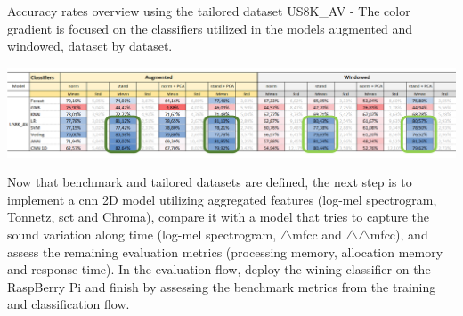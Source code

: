 \begin{table}[ht!]
    \caption[Accuracy rates overview using using the tailored dataset US8K\_AV - Models augmented x windowed (Focus on the classifiers dataset by dataset)]{Accuracy rates overview using the tailored dataset US8K\_AV - The color gradient is focused on the classifiers utilized in the models augmented and windowed, dataset by dataset.}
    \label{table:results_accuracy_overview_us8k_av_aug_wind_1}
     \raggedright
    \includegraphics[width=1\textwidth]{resources/images/060-results/Results_classification_overview_us8k_av_aug_x_ori_2.png}
\end{table}

Now that benchmark and tailored datasets are defined, the next step is to implement a \gls{cnn} 2D model utilizing aggregated features (log-mel spectrogram, Tonnetz, \gls{sct} and Chroma), compare it with a model that tries to capture the sound variation along time (log-mel spectrogram, $\triangle$\gls{mfcc} and $\triangle\triangle$\gls{mfcc}), and assess the remaining evaluation metrics (processing memory, allocation memory and response time). In the evaluation flow, deploy the wining classifier on the RaspBerry Pi and finish by assessing the benchmark metrics from the training and classification flow.


